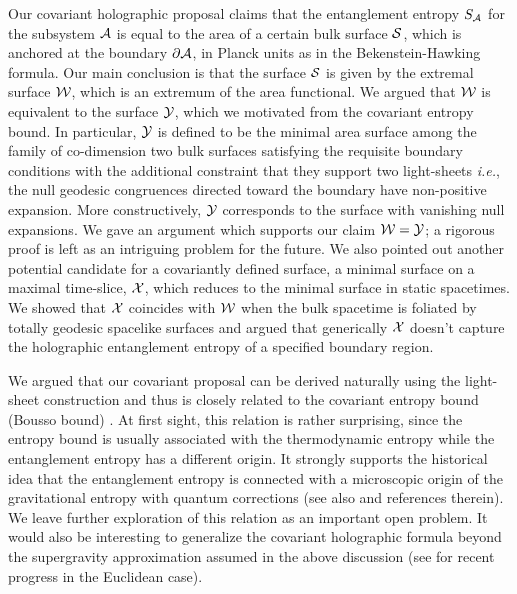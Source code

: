 \documentclass[12pt]{article}
\def\ie{{\it i.e.}}
\def\p{\partial}
\def\CA{{\cal A}}
\def\CS{{\cal S}}
\def\CW{{\cal W}}
\def\CX{{\cal X}}
\def\CY{{\cal Y}}
\def\p{\partial}
\def\p{\partial}
\def\ms{\CS}
\def\Gms{\CW}
\def\Lms{\CY}
\def\Xms{\CX}
\def\rA{\CA}
\def\brA{\p \CA}
\begin{document}
Our covariant holographic proposal claims that the
entanglement entropy $S_{\rA}$ for the subsystem $\rA$ is equal to
the area of a certain bulk surface $\ms$, which is anchored at the
boundary $\brA$,  in Planck units as in the Bekenstein-Hawking
formula. Our main conclusion is that the surface $\ms$ is given
by the extremal surface $\Gms$, which is an extremum of the area functional.
We argued that $\Gms$ is equivalent to the surface $\Lms$, which we motivated from the covariant entropy bound.  In particular, $\Lms$ is defined to be the minimal area surface
among the family of co-dimension two bulk surfaces satisfying the requisite boundary conditions with the additional constraint that they support two light-sheets \ie, the null geodesic congruences directed toward the boundary have non-positive expansion.
More constructively, $\Lms$ corresponds to the surface with vanishing null expansions.
We gave an argument which supports our claim  $\Gms=\Lms$; a rigorous proof is left as an intriguing problem for the future. We also pointed out  another potential candidate for a covariantly defined surface, a minimal surface on a maximal time-slice, $\Xms$, which reduces to the minimal surface in static spacetimes.
We showed that $\Xms$ coincides with $\Gms$ when the bulk spacetime is foliated by totally geodesic spacelike surfaces and argued that generically $\Xms$ doesn't capture the holographic entanglement entropy of a specified boundary region.

We argued that our covariant proposal can be derived naturally
using the light-sheet construction and thus is closely related to
the covariant entropy bound (Bousso bound) \cite{Bousso:1999xy}. At
first sight, this relation is rather surprising, since the entropy
bound is usually associated with the thermodynamic entropy while
the entanglement entropy has a different origin. It strongly
supports the historical idea that the entanglement entropy is connected with a
microscopic origin of the gravitational entropy with quantum
corrections \cite{Bombelli:1986rw, Srednicki:1993im} (see also
\cite{Hawking:2000da, Emparan:2006ni} and references therein). We leave further exploration of this relation as an important open problem. It would  also be interesting to generalize the covariant holographic formula beyond the
supergravity approximation assumed in the above discussion (see \cite{Fursaev:2006ih} for  recent progress in the Euclidean case).
\end{document}
